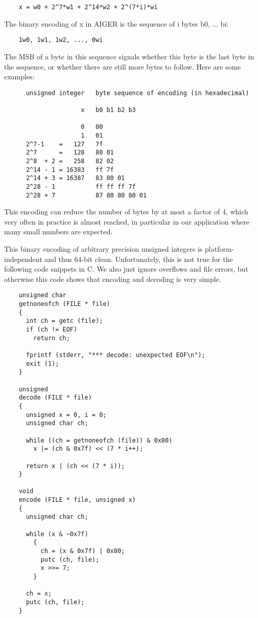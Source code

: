 \documentclass{llncs}
\begin{document}
\begin{verbatim}
    x = w0 + 2^7*w1 + 2^14*w2 + 2^(7*i)*wi
\end{verbatim}

  The binary encoding of x in AIGER is the sequence of i bytes b0, ... bi:

\begin{verbatim}
    1w0, 1w1, 1w2, ..., 0wi
\end{verbatim}

  The MSB of a byte in this sequence signals whether this byte is the last
  byte in the sequence, or whether there are still more bytes to follow.
  Here are some examples:
    
\begin{verbatim}
      unsigned integer   byte sequence of encoding (in hexadecimal)
 
                     x   b0 b1 b2 b3
                        
                     0   00
                     1   01
      2^7-1    =   127   7f
      2^7      =   128   80 01
      2^8  + 2 =   258   82 02
      2^14 - 1 = 16383   ff 7f
      2^14 + 3 = 16387   83 80 01
      2^28 - 1           ff ff ff 7f
      2^28 + 7           87 80 80 80 01
\end{verbatim}

  This encoding can reduce the number of bytes by at most a factor of 4,
  which very often in practice is almost reached, in particular in our
  application where many small numbers are expected.
  
  This binary encoding of arbitrary precision unsigned integers is
  platform-independent and thus 64-bit clean.  Unfortunately, this is not
  true for the following code snippets in C.  We also just ignore overflows
  and file errors, but otherwise this code shows that encoding and decoding
  is very simple.

\begin{verbatim}
    unsigned char
    getnoneofch (FILE * file)
    {
      int ch = getc (file);
      if (ch != EOF)
        return ch;

      fprintf (stderr, "*** decode: unexpected EOF\n");
      exit (1);
    }

    unsigned
    decode (FILE * file)
    {
      unsigned x = 0, i = 0;
      unsigned char ch;

      while ((ch = getnoneofch (file)) & 0x80)
        x |= (ch & 0x7f) << (7 * i++);

      return x | (ch << (7 * i));
    }

    void
    encode (FILE * file, unsigned x)
    {
      unsigned char ch;

      while (x & ~0x7f)
        {
          ch = (x & 0x7f) | 0x80;
          putc (ch, file);
          x >>= 7;
        }
     
      ch = x;
      putc (ch, file);
    }
\end{verbatim}
\end{document}
